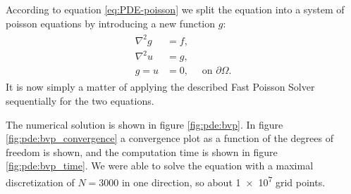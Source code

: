 According to equation \eqref{eq:PDE-poisson} we split the equation into a system of poisson equations by introducing a new function $g$:
\begin{align*}
  \begin{split}
    \nabla^2g &= f,\\
    \nabla^2u &= g,\\
    g = u &= 0,\quad \text{ on } \partial \Omega.
  \end{split}
\end{align*}
It is now simply a matter of applying the described Fast Poisson Solver sequentially for the two equations.

The numerical solution is shown in figure \ref{fig:pde:bvp}.
In figure \ref{fig:pde:bvp_convergence} a convergence plot as a function of the degrees of freedom is shown, and the computation time is shown in figure \ref{fig:pde:bvp_time}.
We were able to solve the equation with a maximal discretization of $N = 3000$ in one direction, so about \num{1e7} grid points.


\newcommand{\biharmshowsol}[1]{
  \begin{tikzpicture}
    \pgfplotsset{colormap={redblue}{rgb=(0,0,1) rgb=(1,1,1) rgb=(1,0,0)}}
    \begin{axis}[
	      width=15.2cm, height=12.5cm,
		  xmin=0, xmax=1, ymin=0, ymax=1, zmin=0,
	      xlabel=$x$, xtick distance=0.25,
	      ylabel=$y$, ytick distance=0.25,
        zlabel={$u(x, y)$},
        mesh/ordering=x varies,
        mesh/cols=#1,
        mesh/rows=#1,
	      view={20}{50},
      ]
	    \addplot3 [
		    surf,
        point meta=explicit,
	    ] table[meta=U]{./PDE/biharmonic_solution_#1.dat};
    \end{axis}
  \end{tikzpicture}
}

